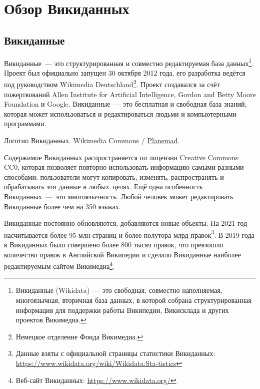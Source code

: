 \chapter{Обзор Викиданных}
\label{ch:ReviewAboutWD}

\section{Викиданные}

Викиданные~--- это структурированная и совместно редактируемая база данных\footnote[][-15pt]{Викиданные (Wikidata)~--- это свободная, совместно наполняемая, многоязычная, вторичная база данных, в которой собрана структурированная информация для поддержки работы Википедии, Викисклада и других проектов Викимедиа.}. Проект был официально запущен 30 октября 2012 года, его разработка ведётся под руководством Wikimedia Deutschland\footnote[][5pt]{Немецкое отделение Фонда Викимедиа.}. Проект создавался за счёт пожертвований Allen Institute for Artificial Intelligence, Gordon and Betty Moore Foundation и Google. Викиданные~--- это бесплатная и свободная база знаний, которая может использоваться и редактироваться людьми и компьютерными программами\autocite{Vrandecic}.\begin{marginfigure}[0.0cm]
{
	\setlength{\fboxsep}{0pt}%
	\setlength{\fboxrule}{1pt}%
}
\caption
{Логотип Викиданных. \newline
Wikimedia Commons / \href{https://commons.wikimedia.org/wiki/File:Wikidata-logo-en.svg}{Planemad}. 
}
\label{fig:seyu}
\end{marginfigure}

Содержимое Викиданных распространяется по лицензии Creative Commons CC0, которая позволяет повторно использовать информацию самыми разными способами: пользователи могут копировать, изменять, распространять и обрабатывать эти данные в любых целях. Ещё одна особенность Викиданных~--- это многоязычность. Любой человек может редактировать Викиданные более чем на 350 языках.

Викиданные постоянно обновляются, добавляются новые объекты. На 2021 год насчитывается более 95 млн страниц и более полутора млрд правок\footnote[][5px]{Данные взяты с официальной страницы статистики Викиданных: \href{https://www.wikidata.org/wiki/Wikidata:Statistics}{https://www.wikidata.org/wiki/Wikidata:Sta-tistics}}. В 2019 года в Викиданных было совершено более 800 тысяч правок, что превзошло количество правок в Английской Википедии и сделало Викиданные наиболее редактируемым сайтом Викимедиа\footnote[][5px]{Веб-сайт Викиданных: \href{https://www.wikidata.org/}{https://www.wikidata.org/}}.

